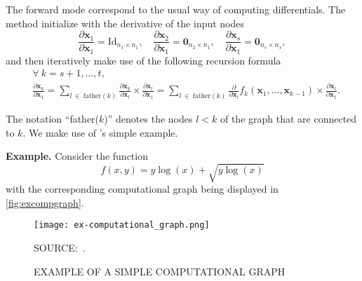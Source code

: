 The forward mode correspond to the usual way of computing differentials.
The method initialize with the derivative of the input nodes
\[
  \frac{\partial \mathbf{x}_{1}}{\partial \mathbf{x}_{1}} =
  \text{Id}_{n_{1} \times n_{1}}, \quad
  \frac{\partial \mathbf{x}_{2}}{\partial \mathbf{x}_{1}} =
  \mathbf{0}_{n_{2} \times n_{1}}, \quad
  \frac{\partial \mathbf{x}_{s}}{\partial \mathbf{x}_{1}} =
  \mathbf{0}_{n_{s} \times n_{1}},
\]
and then iteratively make use of the following recursion formula
\begin{align*}
  &\forall~k = s + 1, \dots, t,\\
  &\frac{\partial\mathbf{x}_{k}}{\partial\mathbf{x}_{1}} =
    \sum_{l~\in~\text{father}(k)}
    \frac{\partial\mathbf{x}_{k}}{\partial\mathbf{x}_{l}} \times
    \frac{\partial\mathbf{x}_{l}}{\partial\mathbf{x}_{1}} =
    \sum_{l~\in~\text{father}(k)}
    \frac{\partial}{\partial\mathbf{x}_{l}}
    f_{k}(\mathbf{x}_{1}, \dots, \mathbf{x}_{k-1}) \times
    \frac{\partial\mathbf{x}_{l}}{\partial\mathbf{x}_{1}}.
\end{align*}

The notation ``father(\(k\))'' denotes the nodes \(l < k\) of the graph
that are connected to \(k\). We make use of 's
simple example.

\noindent\textbf{Example.}\hspace{.5cm}
Consider the function
\[
  f(x, y) = y\log(x) + \sqrt{y\log(x)}
\]
with the corresponding computational graph being displayed in
\autoref{fig:excompgraph}.

\begin{figure}[H]
  \setlength{\abovecaptionskip}{.0001pt}
  \caption{EXAMPLE OF A SIMPLE COMPUTATIONAL GRAPH}
  \vspace{0.425cm} \centering
  \texttt{[image: ex-computational\_graph.png]}
  \\
  \vspace{0.45cm}
  \begin{footnotesize}
    SOURCE:~.
  \end{footnotesize}
  \label{fig:excompgraph}
\end{figure}

